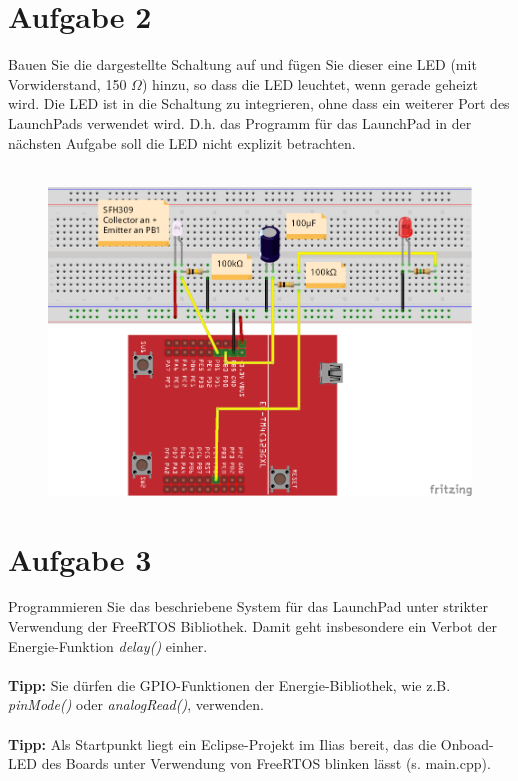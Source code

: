 \section{Aufgabe 2}
Bauen Sie die dargestellte Schaltung auf und fügen Sie dieser eine LED (mit Vorwiderstand, 150 $\Omega$) hinzu, so dass die LED leuchtet, wenn gerade geheizt wird. Die LED ist in die Schaltung zu integrieren, ohne dass ein weiterer Port des LaunchPads verwendet wird. D.h. das Programm für das LaunchPad in der nächsten Aufgabe soll die LED nicht explizit betrachten.\\ \\
\begin{figure}[h!]
	\centering
	\includegraphics[width=0.7\linewidth]{images/Schaltplan7}
\end{figure}

	
\section{Aufgabe 3}
Programmieren Sie das beschriebene System für das LaunchPad unter strikter Verwendung der FreeRTOS Bibliothek. Damit geht insbesondere ein Verbot der Energie-Funktion \textit{delay()} einher.\\ \\
\textbf{Tipp:} Sie dürfen die GPIO-Funktionen der Energie-Bibliothek, wie z.B. \textit{pinMode()} oder \textit{analogRead()}, verwenden.\\ \\
\textbf{Tipp:} Als Startpunkt liegt ein Eclipse-Projekt im Ilias bereit, das die Onboad-LED des Boards unter Verwendung von FreeRTOS blinken lässt (s. main.cpp).
